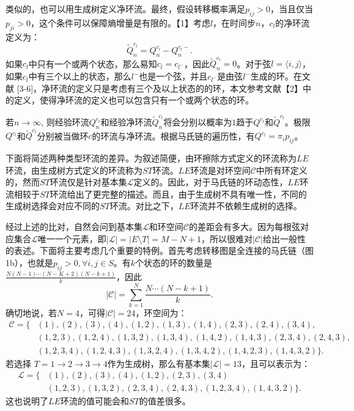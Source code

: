 类似的，也可以用生成树定义净环流。最终，假设转移概率满足$p_{ij}>0$，当且仅当$p_{ji}>0$，这个条件可以保障熵增量是有限的。【1】考虑$l
$，在时间步$n$，$c_l$的净环流定义为：
\begin{equation*}
    \tilde{Q}^{c_l}_n=Q^{c_l}_n-Q^{c_l-}_n.
\end{equation*}
如果$c_l$中只有一个或两个状态，那么易知$c_l = c_{l^-}$，因此$\tilde{Q}_n^{c_l}=0$。对于弦$l=\langle i,j \rangle$，如果$c_l$中有三个以上的状态，那么$l^-$也是一个弦，并且$c_{l^-}$是由弦$l^-$生成的环。在文献 [3-6]，净环流的定义只是考虑有三个及以上状态的的环，本文参考文献【2】中的定义，使得净环流的定义也可以包含只有一个或两个状态的环。

若$n \to \infty$, 则经验环流$Q_n^{c_l}$和经验净环流$\tilde{Q}_n^{c_l}$将会分别以概率为$1$趋于$Q^{c_l}$和$\tilde{Q}^{c_l}$。极限$Q^{c_l}$和$\tilde{Q}^{c_l}$分别被当做环$c$的环流与净环流。根据马氏链的遍历性，有$Q^{c_l} = \pi_i p_{ij}$。

下面将简述两种类型环流的差异。为叙述简便，由环擦除方式定义的环流称为$LE$环流，由生成树方式定义的环流称为$ST$环流。$LE$环流是对环空间$\mathcal{C}$中所有环定义的，然而$ST$环流仅是针对基本集$\mathcal{L}$定义的。因此，对于马氏链的环动态性，$LE$环流相较于$ST$环流给出了更完整的描述。而且，由于生成树不具有唯一性，不同的生成树选择会对应不同的$ST$环流。对比之下，$LE$环流并不依赖生成树的选择。

经过上述的比对，自然会问到基本集$\mathcal{L}$和环空间$\mathcal{C}$的差距会有多大。因为每根弦对应集合$\mathcal{L}$唯一一个元素，即$|\mathcal{L}| = |E\setminus T| = M-N+1$，所以很难对$|\mathcal{C}|$给出一般性的表述。下面将主要考虑几个重要的特例。首先考虑转移图是全连接的马氏链（图1b），也就是$p_{ij}>0, \forall i,j \in S$。有$k$个状态的环的数量是$\frac{N (N-1) \cdots (N-K+2)(N-k+1)}{k}$，因此
\begin{equation*}
    |\mathcal{C}| = \sum_{k=1}^N\frac{N\cdots (N-k+1)}{k}.
\end{equation*}
确切地说，若$N=4$，可得$|\mathcal{C}|=24$，环空间为：
\begin{align*}
    \mathcal{C} = \{&(1),(2),(3),(4),(1,2),(1,3),(1,4),(2,3),(2,4),(3,4),\\
    &(1,2,3),(1,2,4),(1,3,2),(1,3,4),(1,4,2),(1,4,3),(2,3,4),(2,4,3),\\
    &(1,2,3,4),(1,2,4,3),(1,3,2,4),(1,3,4,2),(1,4,2,3),(1,4,3,2)\}.
\end{align*}
若选择 $T = 1\to 2\to 3\to 4$作为生成树，那么有基本集$|\mathcal{L}|=13$，且可以表示为：
\begin{align*}
    \mathcal{L} = \{&(1),(2),(3),(4),(1,2),(2,3),(3,4)\\
    &(1,2,3),(1,3,2),(2,3,4),(2,4,3),(1,2,3,4),(1,4,3,2)\}.
\end{align*}
这也说明了$LE$环流的值可能会和$ST$的值差很多。

